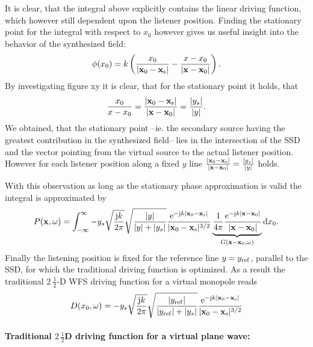 It is clear, that the integral above explicitly contains the linear driving function, which however still dependent upon the listener position. Finding the stationary point for the integral with respect to $x_0$  however gives us useful insight into the behavior of the synthesized field:
\begin{equation}
\phi(x_0) = k \left( \frac{x_0}{| \mathbf{x}_0 - \mathbf{x}_{\mathrm{s}} | } - \frac{x-x_0}{|\mathbf{x}-\mathbf{x}_0|} \right).
\end{equation}
By investigating figure xy it is clear, that for the stationary point it holds, that
\begin{equation}
\frac{x_0}{x-x_0} = \frac{|\mathbf{x}_0-\mathbf{x}_{\mathrm{s}}|}{|\mathbf{x} - \mathbf{x}_0|} = \frac{|y_s|}{|y|}.
\end{equation}
We obtained, that the stationary point --ie. the secondary source having the greatest contribution in the synthesized field-- lies in the intersection of the SSD and the vector pointing from the virtual source to the actual listener position. However for each listener position along a fixed $y$ line $\frac{|\mathbf{x}_0-\mathbf{x}_{\mathrm{s}}|}{|\mathbf{x} - \mathbf{x}_0|} = \frac{|y_s|}{|y|}$ holds.

With this observation as long as the stationary phase approximation is valid the integral is approximated by
\begin{equation}
P(\mathbf{x},\omega) = \int_{-\infty}^{\infty} 
-y_s\sqrt{\frac{\mathrm{j} k}{2 \pi}}
\sqrt{ \frac{|y|}{ |y| + |y_s|}}
\frac{\mathrm{e}^{-\mathrm{j} k  |\mathbf{x}_0 - \mathbf{x}_{\mathrm{s}}| }}{|\mathbf{x}_0-\mathbf{x}_{\mathrm{s}}|^{3/2} }
\underbrace{\frac{1}{4\pi}
\frac{\mathrm{e}^{-\mathrm{j} k |\mathbf{x} - \mathbf{x}_0| }}{|\mathbf{x} - \mathbf{x}_0|}}_{G(\mathbf{x}-\mathbf{x}_0,\omega)}
 \mathrm{d} x_0.
\end{equation}
Finally the listening position is fixed for the reference line $y = y_{\mathrm{ref}}$, parallel to the SSD, for which the traditional driving function is optimized. As a result the traditional $2~\frac{1}{2}$-D WFS driving function for a virtual monopole reads
\begin{equation}
D(x_0,\omega) = -y_s\sqrt{\frac{\mathrm{j} k}{2 \pi}}
\sqrt{ \frac{|y_{\mathrm{ref}}|}{ |y_{\mathrm{ref}}| + |y_s|}}
\frac{\mathrm{e}^{-\mathrm{j} k  |\mathbf{x}_0 - \mathbf{x}_{\mathrm{s}}| }}{|\mathbf{x}_0-\mathbf{x}_{\mathrm{s}}|^{3/2} }
\end{equation}

\paragraph{Traditional $2\, \frac{1}{2}$D driving function for a virtual plane wave:\\}

